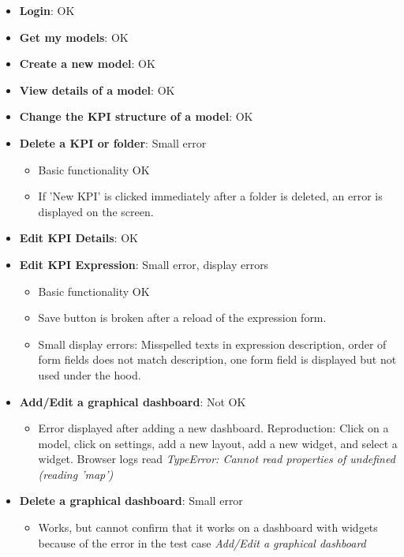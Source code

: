 \begin{itemize}
    \item \textbf{Login}: \textcolor{mutedGreen}{OK}
    \item \textbf{Get my models}: \textcolor{mutedGreen}{OK}
    \item \textbf{Create a new model}: \textcolor{mutedGreen}{OK}
    \item \textbf{View details of a model}: \textcolor{mutedGreen}{OK}
    \item \textbf{Change the KPI structure of a model}: \textcolor{mutedGreen}{OK}
    \item \textbf{Delete a KPI or folder}: \textcolor{mutedYellow}{Small error}
    \begin{itemize}
        \item Basic functionality OK
        \item If 'New KPI' is clicked immediately after a folder is deleted, an error is displayed on the screen.
    \end{itemize}
    \item \textbf{Edit KPI Details}: \textcolor{mutedGreen}{OK}
    \item \textbf{Edit KPI Expression}: \textcolor{mutedYellow}{Small error, display errors}
    \begin{itemize}
        \item Basic functionality OK
        \item Save button is broken after a reload of the expression form. 
        \item Small display errors: Misspelled texts in expression description, order of form fields does not match description, one form field is displayed but not used under the hood. 
    \end{itemize}
    \item \textbf{Add/Edit a graphical dashboard}: \textcolor{mutedPeach}{Not OK}
    \begin{itemize}
        \item Error displayed after adding a new dashboard. Reproduction: Click on a model, click on settings, add a new layout, add a new widget, and select a widget. Browser logs read \textit{TypeError: Cannot read properties of undefined (reading 'map')}
    \end{itemize}
    \item \textbf{Delete a graphical dashboard}: \textcolor{mutedYellow}{Small error}
    \begin{itemize}
        \item Works, but cannot confirm that it works on a dashboard with widgets because of the error in the test case \textit{Add/Edit a graphical dashboard}

\end{itemize}
\end{itemize}
